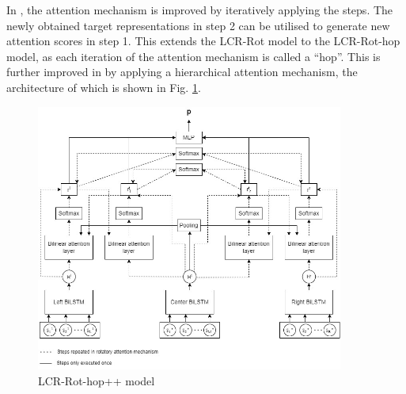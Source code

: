 \documentclass[runningheads]{llncs}
\begin{document}
In \cite{Wallaart2019}, the attention mechanism is improved by iteratively applying the steps. The newly obtained target representations in step 2 can be utilised to generate new attention scores in step 1. This extends the LCR-Rot model to the LCR-Rot-hop model, as each iteration of the attention mechanism is called a ``hop''. This is further improved in \cite{Trusca2020} by applying a hierarchical attention mechanism, the architecture of which is shown in Fig.  \ref{fig:haabsa++}.
\begin{figure}[h]
    \centering
    \includegraphics[width=0.9\textwidth]{Images/LCR-Rot-Hop++.jpg}
    \caption{LCR-Rot-hop++ model}
    \label{fig:haabsa++}
\end{figure}
\end{document}
